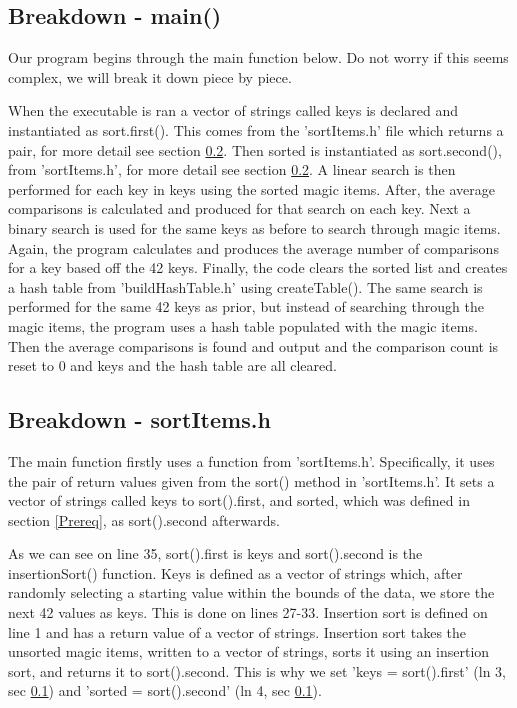 \documentclass[12pt, letterpaper]{article}
\begin{document}
\subsection{Breakdown - main()} \label{Main}
Our program begins through the main function below.
Do not worry if this seems complex, we will break it down piece by piece.

When the executable is ran a vector of strings called keys is declared and instantiated as sort.first().
This comes from the 'sortItems.h' file which returns a pair, for more detail see section \ref{SrtItm}.
Then sorted is instantiated as sort.second(), from 'sortItems.h', for more detail see section \ref{SrtItm}.
\newline
\indent A linear search is then performed for each key in keys using the sorted magic items.
After, the average comparisons is calculated and produced for that search on each key.
Next a binary search is used for the same keys as before to search through magic items.
Again, the program calculates and produces the average number of comparisons for a key based off the 42 keys.
\newline
\indent Finally, the code clears the sorted list and creates a hash table from 'buildHashTable.h' using createTable().
The same search is performed for the same 42 keys as prior, but instead of searching through the magic items, the program uses a hash table populated with the magic items.
Then the average comparisons is found and output and the comparison count is reset to 0 and keys and the hash table are all cleared.

\subsection{Breakdown - sortItems.h} \label{SrtItm}
The main function firstly uses a function from 'sortItems.h'.
Specifically, it uses the pair of return values given from the sort() method in 'sortItems.h'.
It sets a vector of strings called keys to sort().first, and sorted, which was defined in section \ref{Prereq}, as sort().second afterwards.

As we can see on line 35, sort().first is keys and sort().second is the insertionSort() function.
Keys is defined as a vector of strings which, after randomly selecting a starting value within the bounds of the data, we store the next 42 values as keys.
This is done on lines 27-33.
\newline
\indent Insertion sort is defined on line 1 and has a return value of a vector of strings.
Insertion sort takes the unsorted magic items, written to a vector of strings, sorts it using an insertion sort, and returns it to sort().second.
This is why we set 'keys = sort().first' (ln 3, sec \ref{Main}) and 'sorted = sort().second' (ln 4, sec \ref{Main}).
\end{document}

